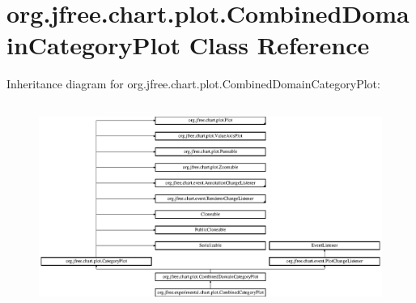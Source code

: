 \hypertarget{classorg_1_1jfree_1_1chart_1_1plot_1_1_combined_domain_category_plot}{}\section{org.\+jfree.\+chart.\+plot.\+Combined\+Domain\+Category\+Plot Class Reference}
\label{classorg_1_1jfree_1_1chart_1_1plot_1_1_combined_domain_category_plot}
Inheritance diagram for org.\+jfree.\+chart.\+plot.\+Combined\+Domain\+Category\+Plot\+:\begin{figure}[H]
\begin{center}
\leavevmode
\includegraphics[height=6.706587cm]{classorg_1_1jfree_1_1chart_1_1plot_1_1_combined_domain_category_plot}
\end{center}
\end{figure}
